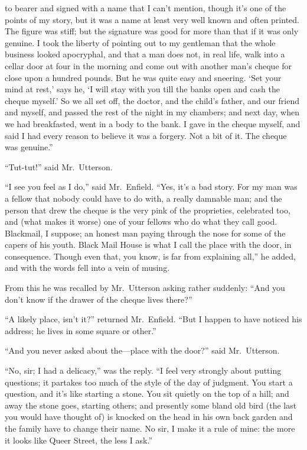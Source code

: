\documentclass[12pt,openright]{book}
\begin{document}
to bearer and signed with a name that I can’t mention, though it’s one of the points of my story, but it was a name at least very well known and often printed. The figure was stiff; but the signature was good for more than that if it was only genuine. I took the liberty of pointing out to my gentleman that the whole business looked apocryphal, and that a man does not, in real life, walk into a cellar door at four in the morning and come out with another man’s cheque for close upon a hundred pounds. But he was quite easy and sneering. ‘Set your mind at rest,’ says he, ‘I will stay with you till the banks open and cash the cheque myself.’ So we all set off, the doctor, and the child’s father, and our friend and myself, and passed the rest of the night in my chambers; and next day, when we had breakfasted, went in a body to the bank. I gave in the cheque myself, and said I had every reason to believe it was a forgery. Not a bit of it. The cheque was genuine.”

“Tut-tut!” said Mr. Utterson.

“I see you feel as I do,” said Mr. Enfield. “Yes, it’s a bad story. For my man was a fellow that nobody could have to do with, a really damnable man; and the person that drew the cheque is the very pink of the proprieties, celebrated too, and (what makes it worse) one of your fellows who do what they call good. Blackmail, I suppose; an honest man paying through the nose for some of the capers of his youth. Black Mail House is what I call the place with the door, in consequence. Though even that, you know, is far from explaining all,” he added, and with the words fell into a vein of musing.

From this he was recalled by Mr. Utterson asking rather suddenly: “And you don’t know if the drawer of the cheque lives there?”

“A likely place, isn’t it?” returned Mr. Enfield. “But I happen to have noticed his address; he lives in some square or other.”

“And you never asked about the—place with the door?” said Mr. Utterson.

“No, sir; I had a delicacy,” was the reply. “I feel very strongly about putting questions; it partakes too much of the style of the day of judgment. You start a question, and it’s like starting a stone. You sit quietly on the top of a hill; and away the stone goes, starting others; and presently some bland old bird (the last you would have thought of) is knocked on the head in his own back garden and the family have to change their name. No sir, I make it a rule of mine: the more it looks like Queer Street, the less I ask.”
\end{document}
